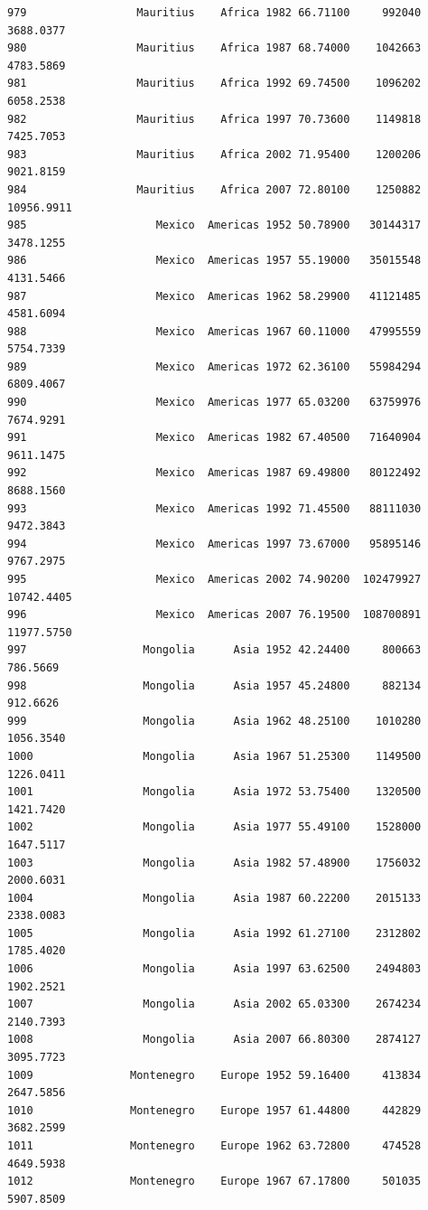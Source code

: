 \documentclass[
  letterpaper,
  DIV=11,
  numbers=noendperiod]{scrreprt}
\begin{document}
\begin{verbatim}
979                 Mauritius    Africa 1982 66.71100     992040   3688.0377
980                 Mauritius    Africa 1987 68.74000    1042663   4783.5869
981                 Mauritius    Africa 1992 69.74500    1096202   6058.2538
982                 Mauritius    Africa 1997 70.73600    1149818   7425.7053
983                 Mauritius    Africa 2002 71.95400    1200206   9021.8159
984                 Mauritius    Africa 2007 72.80100    1250882  10956.9911
985                    Mexico  Americas 1952 50.78900   30144317   3478.1255
986                    Mexico  Americas 1957 55.19000   35015548   4131.5466
987                    Mexico  Americas 1962 58.29900   41121485   4581.6094
988                    Mexico  Americas 1967 60.11000   47995559   5754.7339
989                    Mexico  Americas 1972 62.36100   55984294   6809.4067
990                    Mexico  Americas 1977 65.03200   63759976   7674.9291
991                    Mexico  Americas 1982 67.40500   71640904   9611.1475
992                    Mexico  Americas 1987 69.49800   80122492   8688.1560
993                    Mexico  Americas 1992 71.45500   88111030   9472.3843
994                    Mexico  Americas 1997 73.67000   95895146   9767.2975
995                    Mexico  Americas 2002 74.90200  102479927  10742.4405
996                    Mexico  Americas 2007 76.19500  108700891  11977.5750
997                  Mongolia      Asia 1952 42.24400     800663    786.5669
998                  Mongolia      Asia 1957 45.24800     882134    912.6626
999                  Mongolia      Asia 1962 48.25100    1010280   1056.3540
1000                 Mongolia      Asia 1967 51.25300    1149500   1226.0411
1001                 Mongolia      Asia 1972 53.75400    1320500   1421.7420
1002                 Mongolia      Asia 1977 55.49100    1528000   1647.5117
1003                 Mongolia      Asia 1982 57.48900    1756032   2000.6031
1004                 Mongolia      Asia 1987 60.22200    2015133   2338.0083
1005                 Mongolia      Asia 1992 61.27100    2312802   1785.4020
1006                 Mongolia      Asia 1997 63.62500    2494803   1902.2521
1007                 Mongolia      Asia 2002 65.03300    2674234   2140.7393
1008                 Mongolia      Asia 2007 66.80300    2874127   3095.7723
1009               Montenegro    Europe 1952 59.16400     413834   2647.5856
1010               Montenegro    Europe 1957 61.44800     442829   3682.2599
1011               Montenegro    Europe 1962 63.72800     474528   4649.5938
1012               Montenegro    Europe 1967 67.17800     501035   5907.8509

\end{verbatim}
\end{document}
